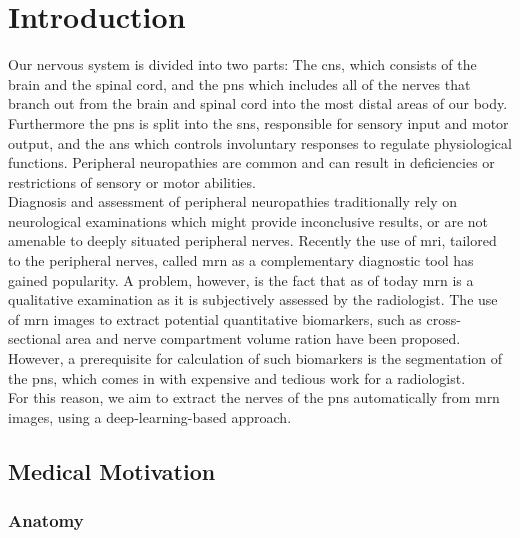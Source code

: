 \chapter{Introduction}
Our nervous system is divided into two parts: The \gls{cns}, which consists of the brain and the spinal cord, and the \gls{pns} which includes all of the nerves that branch out from the brain and spinal cord into the most distal areas of our body. Furthermore the \gls{pns} is split into the \gls{sns}, responsible for sensory input and motor output, and the \gls{ans} which controls involuntary responses to regulate physiological functions. Peripheral neuropathies are common and can result in deficiencies or restrictions of sensory or motor abilities.\\
Diagnosis and assessment of peripheral neuropathies traditionally rely on neurological examinations which might provide inconclusive results, or are not amenable to deeply situated peripheral nerves. Recently the use of \gls{mri}, tailored to the peripheral nerves, called \gls{mrn} as a complementary diagnostic tool has gained popularity. A problem, however, is the fact that as of today \gls{mrn} is a qualitative examination as it is subjectively assessed by the radiologist. The use of \gls{mrn} images to extract potential quantitative biomarkers, such as cross-sectional area and nerve compartment volume ration have been proposed. However, a prerequisite for calculation of such biomarkers is the segmentation of the \gls{pns}, which comes in with expensive and tedious work for a radiologist.\\
For this reason, we aim to extract the nerves of the \gls{pns} automatically from \gls{mrn} images, using a deep-learning-based approach.




\section{Medical Motivation}

\subsection{Anatomy}

